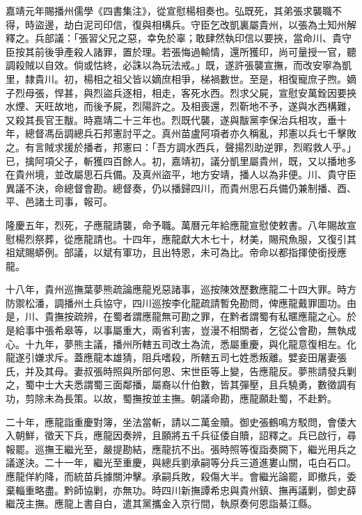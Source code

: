 \begin{pinyinscope}
嘉靖元年賜播州儒學《四書集注》，從宣慰楊相奏也。弘既死，其弟張求襲職不得，時盜邊，劫白泥司印信，復與相構兵。守臣乞改凱裏屬貴州，以張為土知州解釋之。兵部議：「張習父兄之惡，幸免於辜；敢肆然執印信以要挾，當命川、貴守臣按其前後爭產殺人諸罪，置於理。若張悔過輸情，還所獲印，尚可量授一官，聽調殺賊以自效。倘或怙終，必誅以為玩法戒。」既，遂許張襲宣撫，而改安寧為凱里，隸貴川。初，楊相之祖父皆以嫡庶相爭，梯禍數世。至是，相復寵庶子煦。嫡子烈母張，悍甚，與烈盜兵逐相，相走，客死水西。烈求父屍，宣慰安萬銓因要挾水煙、天旺故地，而後予屍，烈陽許之。及相喪還，烈靳地不予，遂與水西構難，又殺其長官王黻。時嘉靖二十三年也。烈既代襲，遂與黻黨李保治兵相攻，垂十年，總督馮岳調總兵石邦憲討平之。真州苗盧阿項者亦久稱亂，邦憲以兵七千擊敗之。有言賊求援於播者，邦憲曰：「吾方調水西兵，聲揚烈助逆罪，烈暇救人乎。」已，擒阿項父子，斬獲四百餘人。初，嘉靖初，議分凱里屬貴州，既，又以播地多在貴州境，並改屬思石兵備。及真州盜平，地方安靖，播人以為非便。川、貴守臣異議不決，命總督會勘。總督奏，仍以播歸四川，而貴州思石兵備仍兼制播、酉、平、邑諸土司事，報可。

隆慶五年，烈死，子應龍請襲，命予職。萬曆元年給應龍宣慰使敕書。八年賜故宣慰楊烈祭葬，從應龍請也。十四年，應龍獻大木七十，材美，賜飛魚服，又復引其祖斌賜蟒例。部議，以斌有軍功，且出特恩，未可為比。帝命以都指揮使銜授應龍。

十八年，貴州巡撫葉夢熊疏論應龍兇惡諸事，巡按陳效歷數應龍二十四大罪。時方防禦松潘，調播州土兵協守，四川巡按李化龍疏請暫免勘問，俾應龍戴罪圖功。由是，川、貴撫按疏辨，在蜀者謂應龍無可勘之罪，在黔者謂蜀有私暱應龍之心。於是給事中張希皋等，以事屬重大，兩省利害，豈漫不相關者，乞從公會勘，無執成心。十九年，夢熊主議，播州所轄五司改土為流，悉屬重慶，與化龍意復相左。化龍遂引嫌求斥。蓋應龍本雄猜，阻兵嗜殺，所轄五司七姓悉叛離。嬖妾田屠妻張氏，并及其母。妻叔張時照與所部何恩、宋世臣等上變，告應龍反。夢熊請發兵剿之，蜀中士大夫悉謂蜀三面鄰播，屬裔以什伯數，皆其彈壓，且兵驍勇，數徵調有功，剪除未為長策。以故，蜀撫按並主撫。朝議命勘，應龍願赴蜀，不赴黔。

二十年，應龍詣重慶對簿，坐法當斬，請以二萬金贖。御史張鶴鳴方駁問，會倭大入朝鮮，徵天下兵，應龍因奏辨，且願將五千兵征倭自贖，詔釋之。兵已啟行，尋報罷。巡撫王繼光至，嚴提勘結，應龍抗不出。張時照等復詣奏闕下，繼光用兵之議遂決。二十一年，繼光至重慶，與總兵劉承嗣等分兵三道進婁山關，屯白石口。應龍佯約降，而統苗兵據關沖擊。承嗣兵敗，殺傷大半。會繼光論罷，即撤兵，委棄輜重略盡。黔師協剿，亦無功。時四川新撫譚希忠與貴州鎮、撫再議剿，御史薛繼茂主撫。應龍上書自白，遣其黨攜金入京行間，執原奏何恩詣綦江縣。


\end{pinyinscope}
